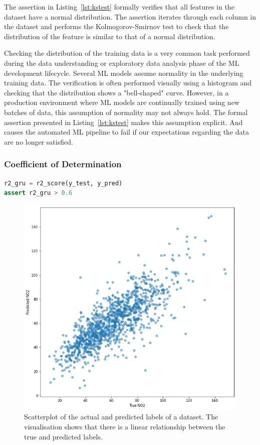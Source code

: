 \documentclass[conference]{IEEEtran}
\begin{document}
The assertion in Listing~\ref{lst:kstest} formally verifies that all features in the dataset have a normal distribution. The assertion iterates through each column in the dataset and performs the Kolmogorov-Smirnov test to check that the distribution of the feature is similar to that of a normal distribution.

Checking the distribution of the training data is a very common task performed during the data understanding or exploratory data analysis phase of the ML development lifecycle. Several ML models assume normality in the underlying training data. The verification is often performed visually using a histogram and checking that the distribution shows a "bell-shaped" curve\cite{CITME}. However, in a production environment where ML models are continually trained using new batches of data, this assumption of normality may not always hold. The formal assertion presented in Listing~\ref{lst:kstest} makes this assumption explicit. And causes the automated ML pipeline to fail if our expectations regarding the data are no longer satisfied.

\subsubsection{Coefficient of Determination}\label{sec:r2}

\begin{lstlisting}[language=Python, caption={Assertion to check that the Coefficient of Determination ($R^2$) is higer than the specified threshold.}, label={lst:r2}]
r2_gru = r2_score(y_test, y_pred)
assert r2_gru > 0.6
\end{lstlisting}

\begin{figure}
  \includegraphics[width=\linewidth]{../catalogue/select-332a.png}
  \caption{Scatterplot of the actual and predicted labels of a dataset. The visualisation shows that there is a linear relationship between the true and predicted labels.}\label{fig:r2}
\end{figure}
\end{document}
